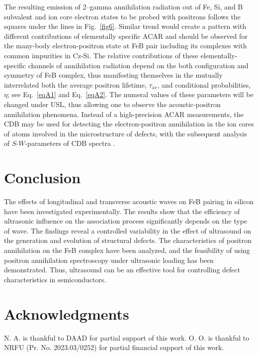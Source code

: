 \documentclass{ttp}
\begin{document}
The resulting emission of 2–gamma annihilation radiation out of Fe, Si, and B subvalent and ion core electron states
to be probed with positrons follows the squares under the lines in Fig.~\ref{fig6}.
Similar trend would create a pattern with different contributions of elementally specific ACAR
and should be observed for the many-body electron-positron state at FeB pair including its complexes with common impurities in Cz-Si.
The relative contributions of these elementally-specific channels of annihilation radiation depend on the both configuration and symmetry of FeB complex,
thus manifesting themselves in the mutually interrelated both the average positron lifetime,
$\tau_\mathrm{av}$, and conditional probabilities, $\eta$;
see Eq.~\ref{eqA1} and Eq.~\ref{eqA2}.
The numeral values of these parameters will be changed under USL,
thus allowing one to observe the acoustic-positron annihilation phenomena.
Instead of a high-precision ACAR measurements, the CDB may be used for detecting the electron-positron annihilation in the ion cores
of atoms involved in the microstructure of defects, with the subsequent analysis of $S$-$W$-parameters of CDB spectra \cite{Krause1999}.

\section{Conclusion}

The effects of longitudinal and transverse acoustic waves on FeB pairing in silicon have been investigated experimentally.
The results show that the efficiency of ultrasonic influence on the association process significantly depends on the type of wave.
The findings reveal a controlled variability in the effect of ultrasound on the generation and evolution of structural defects.
The characteristics of positron annihilation on the FeB complex have been analyzed,
and the feasibility of using positron annihilation spectroscopy under ultrasonic loading has been demonstrated.
Thus, ultrasound can be an effective tool for controlling defect characteristics in semiconductors.



\section{Acknowledgments}
N. A. is thankful to DAAD for partial support of this work.
O. O. is thankful to NRFU (Pr. No. 2023.03/0252) for partial financial support of this work.
\end{document}
